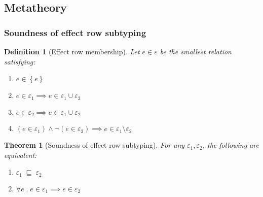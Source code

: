 \documentclass[12pt]{article}
\newtheorem{definition}{Definition}
\newtheorem{theorem}{Theorem}
\newcommand\parens[1]{\left( #1 \right)}
\newcommand\row{\varepsilon}
\newcommand\rsingleton[1]{\left\{ #1 \right\}}
\newcommand\runion[2]{#1 \cup #2}
\newcommand\rdiff[2]{#1 \setminus #2}
\newcommand\effect{e}
\newcommand\contained[2]{#1 \; \sqsubseteq \; #2}
\begin{document}
    \subsection{Metatheory}

      \subsubsection{Soundness of effect row subtyping}

        \begin{definition}[Effect row membership]
          Let $\effect \in \row$ be the smallest relation satisfying:
          \begin{enumerate}
            \item $\effect \in \rsingleton{\effect}$
            \item $\effect \in \row_1 \implies \effect \in \runion{\row_1}{\row_2}$
            \item $\effect \in \row_2 \implies \effect \in \runion{\row_1}{\row_2}$
            \item $\parens{\effect \in \row_1} \wedge \neg \parens{\effect \in \row_2} \implies \effect \in \rdiff{\row_1}{\row_2}$
          \end{enumerate}
        \end{definition}

        \begin{theorem}[Soundness of effect row subtyping]
          For any $\row_1, \row_2$, the following are equivalent:
          \begin{enumerate}
            \item $\contained{\row_1}{\row_2}$
            \item $\forall \effect \;.\; \effect \in \row_1 \implies \effect \in \row_2$
          \end{enumerate}
        \end{theorem}
\end{document}
